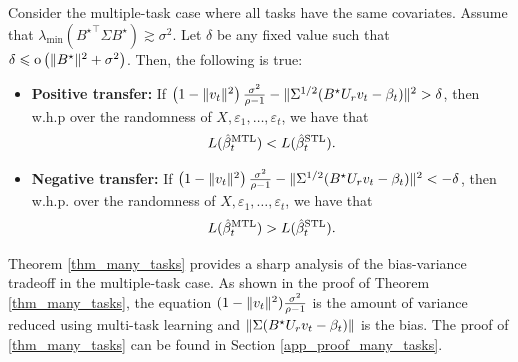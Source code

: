 \begin{theorem}\label{thm_many_tasks}
	Consider the multiple-task case where all tasks have the same covariates.
	Assume that $\lambda_{\min}({B^{\star}}^\top\Sigma B^{\star})\gtrsim \sigma^2$.
	Let $\delta$ be any fixed value such that $\delta \leqslant \operatorname{o} \left( \|B^\star\|^2 + \sigma^2\right)$.
	Then, the following is true:
	\begin{itemize}
		\item \textbf{Positive transfer:} If $\left(1 - \|v_t\|^2 \right)\frac{\sigma^2}{\rho - 1} - \|\Sigma^{1/2} (B^{\star} U_r v_t - \beta_t)\|^2 > \delta$, then w.h.p over the randomness of $X, \varepsilon_1, \dots, \varepsilon_t$, we have that
		 \[ L(\hat{\beta}_t^{\textup{MTL}}) < L(\hat{\beta}_t^{\textup{STL}}). \]
		\item \textbf{Negative transfer:} If $\left(1 - \|v_t\|^2\right)\frac{\sigma^2}{\rho - 1} - \|\Sigma^{1/2}(B^{\star} U_r v_t - \beta_t)\|^2 < -\delta$, then w.h.p. over the randomness of $X, \varepsilon_1, \dots, \varepsilon_t$, we have that
		\[ L(\hat{\beta}_t^{\textup{MTL}}) > L(\hat{\beta}_t^{\textup{STL}}). \]
	\end{itemize}
\end{theorem}
Theorem \ref{thm_many_tasks} provides a sharp analysis of the bias-variance tradeoff in the multiple-task case.
As shown in the proof of Theorem \ref{thm_many_tasks}, the equation $(1 - \|v_t\|^2)\frac {\sigma^2}{\rho - 1}$ is the amount of variance reduced using multi-task learning and $\|\Sigma (B^{\star} U_r v_t - \beta_t)\|$ is the bias.
The proof of \ref{thm_many_tasks} can be found in Section \ref{app_proof_many_tasks}.











